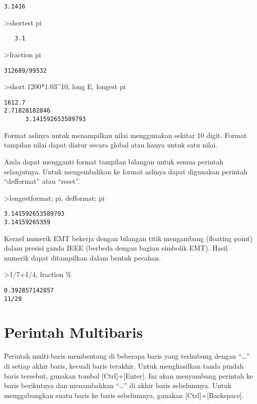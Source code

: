 \documentclass[
]{book}
\begin{document}
\begin{verbatim}
3.1416
\end{verbatim}

\textgreater shortest pi

\begin{verbatim}
   3.1 
\end{verbatim}

\textgreater fraction pi

\begin{verbatim}
312689/99532
\end{verbatim}

\textgreater short 1200*1.03\^{}10, long E, longest pi

\begin{verbatim}
1612.7
2.71828182846
      3.141592653589793 
\end{verbatim}

Format aslinya untuk menampilkan nilai menggunakan sekitar 10 digit. Format tampilan nilai dapat diatur secara global atau hanya untuk satu nilai.

Anda dapat mengganti format tampilan bilangan untuk semua perintah selanjutnya. Untuk mengembalikan ke format aslinya dapat digunakan perintah ``defformat'' atau ``reset''.

\textgreater longestformat; pi, defformat; pi

\begin{verbatim}
3.141592653589793
3.14159265359
\end{verbatim}

Kernel numerik EMT bekerja dengan bilangan titik mengambang (floating point) dalam presisi ganda IEEE (berbeda dengan bagian simbolik EMT). Hasil numerik dapat ditampilkan dalam bentuk pecahan.

\textgreater1/7+1/4, fraction \%

\begin{verbatim}
0.392857142857
11/28
\end{verbatim}

\chapter{Perintah Multibaris}\label{perintah-multibaris}

Perintah multi-baris membentang di beberapa baris yang terhubung dengan ``\ldots{}'' di setiap akhir baris, kecuali baris terakhir. Untuk menghasilkan tanda pindah baris tersebut, gunakan tombol {[}Ctrl{]}+{[}Enter{]}. Ini akan menyambung perintah ke baris berikutnya dan menambahkan ``\ldots{}'' di akhir baris sebelumnya. Untuk menggabungkan suatu baris ke baris sebelumnya, gunakan {[}Ctrl{]}+{[}Backspace{]}.
\end{document}
